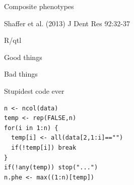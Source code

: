 \documentclass[12pt,t]{beamer}
\begin{document}
\begin{frame}{Composite phenotypes}

\vspace{7mm}


\vspace{7mm}

\hfill {\scriptsize \color{lolit} Shaffer et al. (2013) J Dent Res 92:32-37}

\end{frame}


\begin{frame}[c]{R/qtl}
\end{frame}


\begin{frame}[c]{}

\centerline{\Large Good things}

\vspace{4mm}


\end{frame}


\begin{frame}{}

\vspace*{16.7mm}

\centerline{\Large Bad things}

\end{frame}

\begin{frame}[c,fragile]{Stupidest code ever}

\begin{center}
\begin{minipage}[c]{9.3cm}
\begin{semiverbatim}
\lstset{basicstyle=\normalsize}
\begin{lstlisting}[linewidth=9.3cm]
n <- ncol(data)
temp <- rep(FALSE,n)
for(i in 1:n) {
  temp[i] <- all(data[2,1:i]=="")
  if(!temp[i]) break
}
if(!any(temp)) stop("...")
n.phe <- max((1:n)[temp])
\end{lstlisting}
\end{semiverbatim}
\end{minipage}
\end{center}

\end{frame}
\end{document}
